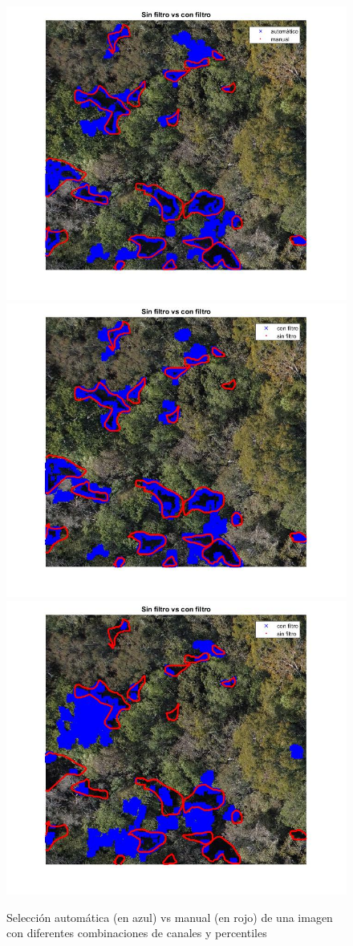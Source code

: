 \begin{figure}
    \\[\smallskipamount]
    \includegraphics[width=.3\textwidth]{Imagenes/IIC/p90/BR/180a.jpg}\hfill
    \includegraphics[width=.3\textwidth]{Imagenes/IIC/p90/BG/180a.jpg}\hfill
    \includegraphics[width=.3\textwidth]{Imagenes/IIC/p90/GR/180a.jpg}\hfill
    
    \caption{Selección automática (en azul) vs manual (en rojo) de una imagen con diferentes combinaciones de canales y percentiles}
\end{figure}\label{dji180}

